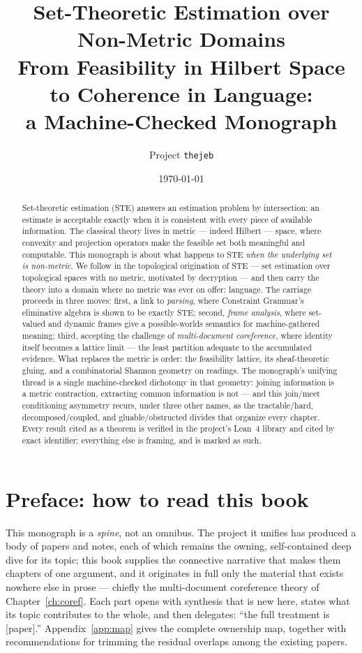 \documentclass[10pt,twocolumn]{report}
\title{Set-Theoretic Estimation over Non-Metric Domains\\
\large From Feasibility in Hilbert Space to Coherence in Language:\\
a Machine-Checked Monograph}
\author{Project \texttt{thejeb}}
\date{\today}
\renewcommand{\[}{\par\smallskip\noindent\begin{adjustbox}{max width=\columnwidth}$\displaystyle}%
\renewcommand{\]}{$\end{adjustbox}\par\smallskip}%
\theoremstyle{definition}
\theoremstyle{remark}
\begin{document}
\maketitle

\begin{abstract}
Set-theoretic estimation (STE) answers an estimation problem by
intersection: an estimate is acceptable exactly when it is consistent
with every piece of available information.  The classical theory
\citep{combettes1993} lives in metric --- indeed Hilbert --- space,
where convexity and projection operators make the feasible set both
meaningful and computable.  This monograph is about what happens to STE
\emph{when the underlying set is non-metric}.  We follow
\citet{carlson2012} in the topological origination of STE --- set
estimation over topological spaces with no metric, motivated by
decryption --- and then carry the theory into a domain where no metric
was ever on offer: language.  The carriage proceeds in three moves:
first, a link to \emph{parsing}, where Constraint Grammar's eliminative
algebra is shown to be exactly STE; second, \emph{frame analysis},
where set-valued and dynamic frames give a possible-worlds semantics
for machine-gathered meaning; third, accepting the challenge of
\emph{multi-document coreference}, where identity itself becomes a
lattice limit --- the least partition adequate to the accumulated
evidence.  What replaces the metric is order: the feasibility lattice,
its sheaf-theoretic gluing, and a combinatorial Shannon geometry on
readings.  The monograph's unifying thread is a single machine-checked
dichotomy in that geometry: joining information is a metric contraction,
extracting common information is not --- and this join/meet conditioning
asymmetry recurs, under three other names, as the tractable/hard,
decomposed/coupled, and gluable/obstructed divides that organize every
chapter.  Every result cited as a theorem is verified in the project's
Lean~4 library and cited by exact identifier; everything else is
framing, and is marked as such.
\end{abstract}

\tableofcontents

\chapter*{Preface: how to read this book}

This monograph is a \emph{spine}, not an omnibus.  The project it
unifies has produced a body of papers and notes, each of which remains
the owning, self-contained deep dive for its topic; this book supplies
the connective narrative that makes them chapters of one argument, and
it originates in full only the material that exists nowhere else in
prose --- chiefly the multi-document coreference theory of
Chapter~\ref{ch:coref}.  Each part opens with synthesis that is new
here, states what its topic contributes to the whole, and then
delegates: ``the full treatment is [paper].''  Appendix~\ref{app:map}
gives the complete ownership map, together with recommendations for
trimming the residual overlaps among the existing papers.
\end{document}
